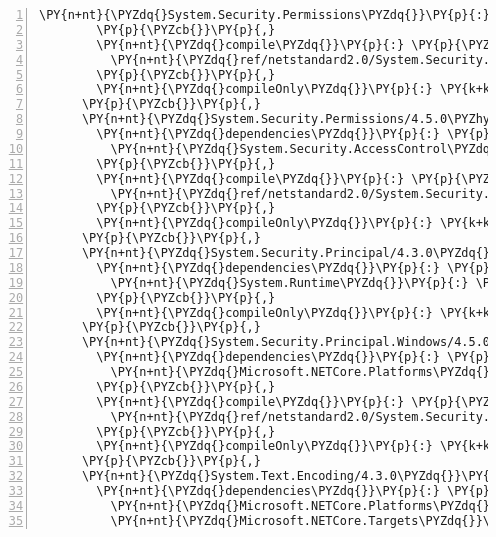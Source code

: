 \begin{Verbatim}[commandchars=\\\{\},numbers=left,firstnumber=1,stepnumber=1,numberblanklines=0]
          \PY{n+nt}{\PYZdq{}System.Security.Permissions\PYZdq{}}\PY{p}{:} \PY{l+s+s2}{\PYZdq{}4.5.0\PYZhy{}rc1\PYZdq{}}
        \PY{p}{\PYZcb{}}\PY{p}{,}
        \PY{n+nt}{\PYZdq{}compile\PYZdq{}}\PY{p}{:} \PY{p}{\PYZob{}}
          \PY{n+nt}{\PYZdq{}ref/netstandard2.0/System.Security.Cryptography.Xml.dll\PYZdq{}}\PY{p}{:} \PY{p}{\PYZob{}}\PY{p}{\PYZcb{}}
        \PY{p}{\PYZcb{}}\PY{p}{,}
        \PY{n+nt}{\PYZdq{}compileOnly\PYZdq{}}\PY{p}{:} \PY{k+kc}{true}
      \PY{p}{\PYZcb{}}\PY{p}{,}
      \PY{n+nt}{\PYZdq{}System.Security.Permissions/4.5.0\PYZhy{}rc1\PYZdq{}}\PY{p}{:} \PY{p}{\PYZob{}}
        \PY{n+nt}{\PYZdq{}dependencies\PYZdq{}}\PY{p}{:} \PY{p}{\PYZob{}}
          \PY{n+nt}{\PYZdq{}System.Security.AccessControl\PYZdq{}}\PY{p}{:} \PY{l+s+s2}{\PYZdq{}4.5.0\PYZhy{}rc1\PYZdq{}}
        \PY{p}{\PYZcb{}}\PY{p}{,}
        \PY{n+nt}{\PYZdq{}compile\PYZdq{}}\PY{p}{:} \PY{p}{\PYZob{}}
          \PY{n+nt}{\PYZdq{}ref/netstandard2.0/System.Security.Permissions.dll\PYZdq{}}\PY{p}{:} \PY{p}{\PYZob{}}\PY{p}{\PYZcb{}}
        \PY{p}{\PYZcb{}}\PY{p}{,}
        \PY{n+nt}{\PYZdq{}compileOnly\PYZdq{}}\PY{p}{:} \PY{k+kc}{true}
      \PY{p}{\PYZcb{}}\PY{p}{,}
      \PY{n+nt}{\PYZdq{}System.Security.Principal/4.3.0\PYZdq{}}\PY{p}{:} \PY{p}{\PYZob{}}
        \PY{n+nt}{\PYZdq{}dependencies\PYZdq{}}\PY{p}{:} \PY{p}{\PYZob{}}
          \PY{n+nt}{\PYZdq{}System.Runtime\PYZdq{}}\PY{p}{:} \PY{l+s+s2}{\PYZdq{}4.3.0\PYZdq{}}
        \PY{p}{\PYZcb{}}\PY{p}{,}
        \PY{n+nt}{\PYZdq{}compileOnly\PYZdq{}}\PY{p}{:} \PY{k+kc}{true}
      \PY{p}{\PYZcb{}}\PY{p}{,}
      \PY{n+nt}{\PYZdq{}System.Security.Principal.Windows/4.5.0\PYZhy{}rc1\PYZdq{}}\PY{p}{:} \PY{p}{\PYZob{}}
        \PY{n+nt}{\PYZdq{}dependencies\PYZdq{}}\PY{p}{:} \PY{p}{\PYZob{}}
          \PY{n+nt}{\PYZdq{}Microsoft.NETCore.Platforms\PYZdq{}}\PY{p}{:} \PY{l+s+s2}{\PYZdq{}2.1.0\PYZhy{}rc1\PYZdq{}}
        \PY{p}{\PYZcb{}}\PY{p}{,}
        \PY{n+nt}{\PYZdq{}compile\PYZdq{}}\PY{p}{:} \PY{p}{\PYZob{}}
          \PY{n+nt}{\PYZdq{}ref/netstandard2.0/System.Security.Principal.Windows.dll\PYZdq{}}\PY{p}{:} \PY{p}{\PYZob{}}\PY{p}{\PYZcb{}}
        \PY{p}{\PYZcb{}}\PY{p}{,}
        \PY{n+nt}{\PYZdq{}compileOnly\PYZdq{}}\PY{p}{:} \PY{k+kc}{true}
      \PY{p}{\PYZcb{}}\PY{p}{,}
      \PY{n+nt}{\PYZdq{}System.Text.Encoding/4.3.0\PYZdq{}}\PY{p}{:} \PY{p}{\PYZob{}}
        \PY{n+nt}{\PYZdq{}dependencies\PYZdq{}}\PY{p}{:} \PY{p}{\PYZob{}}
          \PY{n+nt}{\PYZdq{}Microsoft.NETCore.Platforms\PYZdq{}}\PY{p}{:} \PY{l+s+s2}{\PYZdq{}2.1.0\PYZhy{}rc1\PYZdq{}}\PY{p}{,}
          \PY{n+nt}{\PYZdq{}Microsoft.NETCore.Targets\PYZdq{}}\PY{p}{:} \PY{l+s+s2}{\PYZdq{}2.1.0\PYZhy{}rc1\PYZdq{}}\PY{p}{,}

\end{Verbatim}
